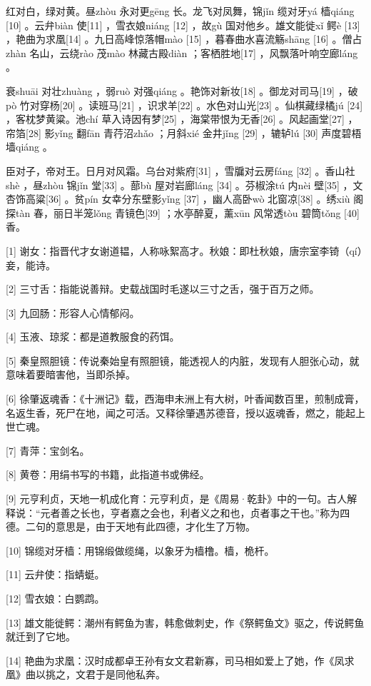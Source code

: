 \documentclass[12pt,UTF8]{ctexbook}
\begin{document}
红对白，绿对黄。昼zhòu 永对更gēng 长。龙飞对凤舞，锦jǐn 缆对牙yá 樯qiáng [10] 。云弁biàn 使[11] ，雪衣娘niáng [12] ，故gù 国对他乡。雄文能徙xǐ 鳄è [13] ，艳曲为求凰[14] 。九日高峰惊落帽mào [15] ，暮春曲水喜流觞shāng [16] 。僧占zhàn 名山，云绕rào 茂mào 林藏古殿diàn ；客栖胜地[17] ，风飘落叶响空廊láng 。

衰shuāi 对壮zhuàng ，弱ruò 对强qiáng 。艳饰对新妆[18] 。御龙对司马[19] ，破pò 竹对穿杨[20] 。读班马[21] ，识求羊[22] 。水色对山光[23] 。仙棋藏绿橘jú [24] ，客枕梦黄粱。池chí 草入诗因有梦[25] ，海棠带恨为无香[26] 。风起画堂[27] ，帘箔[28] 影yǐng 翻fān 青荇沼zhǎo ；月斜xié 金井jǐng [29] ，辘轳lú [30] 声度碧梧墙qiáng 。

臣对子，帝对王。日月对风霜。乌台对紫府[31] ，雪牖对云房fáng [32] 。香山社shè ，昼zhòu 锦jǐn 堂[33] 。蔀bù 屋对岩廊láng [34] 。芬椒涂tú 内nèi 壁[35] ，文杏饰高粱[36] 。贫pín 女幸分东壁影yǐng [37] ，幽人高卧wò 北窗凉[38] 。绣xiù 阁探tàn 春，丽日半笼lǒng 青镜色[39] ；水亭醉夏，薰xūn 风常透tòu 碧筒tǒng [40] 香。


[1] 谢女：指晋代才女谢道韫，人称咏絮高才。秋娘：即杜秋娘，唐宗室李锜（qí）妾，能诗。

[2] 三寸舌：指能说善辩。史载战国时毛遂以三寸之舌，强于百万之师。

[3] 九回肠：形容人心情郁闷。

[4] 玉液、琼浆：都是道教服食的药饵。

[5] 秦皇照胆镜：传说秦始皇有照胆镜，能透视人的内脏，发现有人胆张心动，就意味着要暗害他，当即杀掉。

[6] 徐肇返魂香：《十洲记》载，西海申未洲上有大树，叶香闻数百里，煎制成膏，名返生香，死尸在地，闻之可活。又释徐肇遇苏德音，授以返魂香，燃之，能起上世亡魂。

[7] 青萍：宝剑名。

[8] 黄卷：用绢书写的书籍，此指道书或佛经。

[9] 元亨利贞，天地一机成化育：元亨利贞，是《周易·乾卦》中的一句。古人解释说：“元者善之长也，亨者嘉之会也，利者义之和也，贞者事之干也。”称为四德。二句的意思是，由于天地有此四德，才化生了万物。

[10] 锦缆对牙樯：用锦缎做缆绳，以象牙为樯橹。樯，桅杆。

[11] 云弁使：指蜻蜓。

[12] 雪衣娘：白鹦鹉。

[13] 雄文能徙鳄：潮州有鳄鱼为害，韩愈做刺史，作《祭鳄鱼文》驱之，传说鳄鱼就迁到了它地。

[14] 艳曲为求凰：汉时成都卓王孙有女文君新寡，司马相如爱上了她，作《凤求凰》曲以挑之，文君于是同他私奔。
\end{document}
